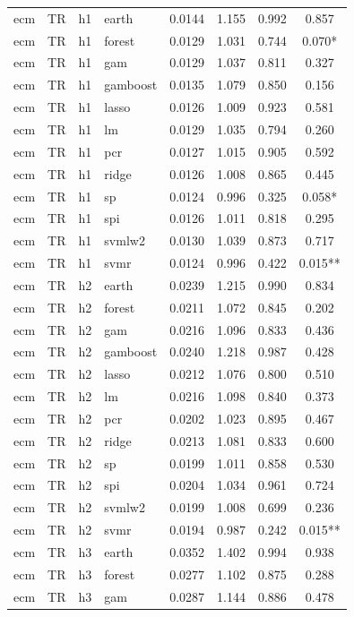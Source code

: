 \begin{ThreePartTable}
\begin{longtable}[t]{llclcccc}
\addlinespace
ecm & TR & h1 & earth & 0.0144 & 1.155 & 0.992 & 0.857\\
ecm & TR & h1 & forest & 0.0129 & 1.031 & 0.744 & 0.070*\\
ecm & TR & h1 & gam & 0.0129 & 1.037 & 0.811 & 0.327\\
ecm & TR & h1 & gamboost & 0.0135 & 1.079 & 0.850 & 0.156\\
ecm & TR & h1 & lasso & 0.0126 & 1.009 & 0.923 & 0.581\\
ecm & TR & h1 & lm & 0.0129 & 1.035 & 0.794 & 0.260\\
ecm & TR & h1 & pcr & 0.0127 & 1.015 & 0.905 & 0.592\\
ecm & TR & h1 & ridge & 0.0126 & 1.008 & 0.865 & 0.445\\
ecm & TR & h1 & sp & 0.0124 & 0.996 & 0.325 & 0.058*\\
ecm & TR & h1 & spi & 0.0126 & 1.011 & 0.818 & 0.295\\
ecm & TR & h1 & svmlw2 & 0.0130 & 1.039 & 0.873 & 0.717\\
ecm & TR & h1 & svmr & 0.0124 & 0.996 & 0.422 & 0.015**\\
\addlinespace
ecm & TR & h2 & earth & 0.0239 & 1.215 & 0.990 & 0.834\\
ecm & TR & h2 & forest & 0.0211 & 1.072 & 0.845 & 0.202\\
ecm & TR & h2 & gam & 0.0216 & 1.096 & 0.833 & 0.436\\
ecm & TR & h2 & gamboost & 0.0240 & 1.218 & 0.987 & 0.428\\
ecm & TR & h2 & lasso & 0.0212 & 1.076 & 0.800 & 0.510\\
ecm & TR & h2 & lm & 0.0216 & 1.098 & 0.840 & 0.373\\
ecm & TR & h2 & pcr & 0.0202 & 1.023 & 0.895 & 0.467\\
ecm & TR & h2 & ridge & 0.0213 & 1.081 & 0.833 & 0.600\\
ecm & TR & h2 & sp & 0.0199 & 1.011 & 0.858 & 0.530\\
ecm & TR & h2 & spi & 0.0204 & 1.034 & 0.961 & 0.724\\
ecm & TR & h2 & svmlw2 & 0.0199 & 1.008 & 0.699 & 0.236\\
ecm & TR & h2 & svmr & 0.0194 & 0.987 & 0.242 & 0.015**\\
\addlinespace
ecm & TR & h3 & earth & 0.0352 & 1.402 & 0.994 & 0.938\\
ecm & TR & h3 & forest & 0.0277 & 1.102 & 0.875 & 0.288\\
ecm & TR & h3 & gam & 0.0287 & 1.144 & 0.886 & 0.478\\

\end{longtable}
\end{ThreePartTable}
